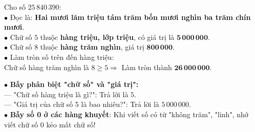 \documentclass[14pt,a4paper,oneside]{extbook}
\begin{document}
\vspace{2mm}

\noindent
\begin{minipage}[t]{0.53\textwidth}
  \begin{tcolorbox}[
    enhanced,
    title={\footnotesize\bfseries\color{white}\faCheckCircle\ Ví dụ thực hành chuẩn mực},
    colback=green!2!white,
    colframe=green!60!black,
    arc=2.5mm, boxrule=0.8pt, top=1.8mm, bottom=1.8mm, left=2.2mm, right=2.2mm
  ]
    \footnotesize
    Cho số $25\,840\,390$:\\
    $\bullet$ Đọc là: \textbf{Hai mươi lăm triệu tám trăm bốn mươi nghìn ba trăm chín mươi}.\\
    $\bullet$ Chữ số $5$ thuộc \textbf{hàng triệu, lớp triệu}, có giá trị là $\mathbf{5\,000\,000}$.\\
    $\bullet$ Chữ số $8$ thuộc \textbf{hàng trăm nghìn}, giá trị $\mathbf{800\,000}$.\\
    $\bullet$ Làm tròn số trên đến hàng triệu:\\
    Chữ số hàng trăm nghìn là $8 \ge 5 \Rightarrow$ Làm tròn thành $\mathbf{26\,000\,000}$.
  \end{tcolorbox}
\end{minipage}%
\hfill
\begin{minipage}[t]{0.45\textwidth}
  \begin{tcolorbox}[
    enhanced,
    title={\footnotesize\bfseries\color{white}\faExclamationTriangle\ Mẹo tránh bẫy trắc nghiệm},
    colback=red!2!white,
    colframe=red!70!black,
    arc=2.5mm, boxrule=0.8pt, top=1.8mm, bottom=1.8mm, left=2.2mm, right=2.2mm
  ]
    \footnotesize
    $\bullet$ \textbf{Bẫy phân biệt "chữ số" và "giá trị":}\\
    --- "Chữ số hàng triệu là gì?": Trả lời là $5$.\\
    --- "Giá trị của chữ số 5 là bao nhiêu?": Trả lời là $5\,000\,000$.\\
    $\bullet$ \textbf{Bẫy số 0 ở các hàng khuyết}: Khi viết số có từ "không trăm", "linh", nhớ viết chữ số $0$ kẻo mất chữ số!
  \end{tcolorbox}
\end{minipage}
\end{document}
